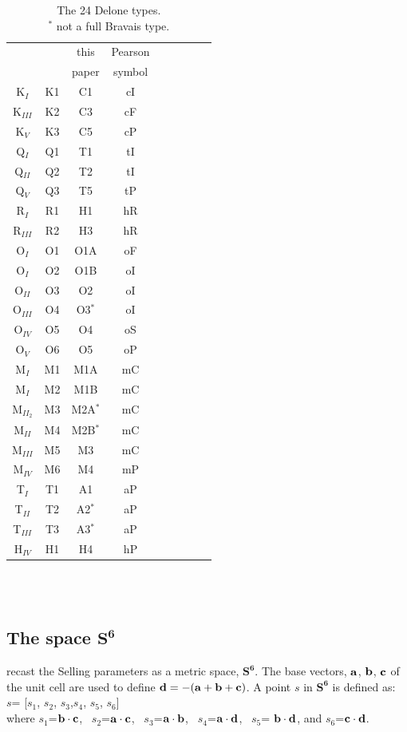 \documentclass[preprint]{iucr}              %
\newcommand{\SVI}[0]{$\mathbf{S^{6}}$}
\newcommand{\scalarsub}[2]{$#1_#2$}
\newcommand{\vdotv}[2]{${{\bf #1 \cdot #2}}$}
\begin{document}
	
	\begin{table}
		\begin{tabular}{ccccccccc}
			\toprule
			\cite{Delaunay1932} & \cite{Burzlaff1985}   &this &Pearson  \\
			&  & paper & symbol\\
			\midrule
			K$_I$ & K1 & C1 & cI \\		
			K$_{III}$ & K2 & C3 &cF \\		
			K$_V$ & K3 & C5 &cP \\		
			Q$_I$ & Q1 & T1 &tI \\		
			Q$_{II}$ & Q2 & T2 &tI \\		
			Q$_V$ & Q3 & T5 & tP\\		
			R$_I$ & R1 & H1 & hR \\		
			R$_{III}$ & R2 & H3 & hR \\		
			O$_I$ & O1 & O1A & oF  \\		
			O$_I$ & O2 & O1B &oI  \\		
			O$_{II}$ & O3 & O2 & oI   \\		
			O$_{III}$ & O4 & O3$^*$ & oI   \\		
			O$_{IV}$ & O5 & O4 & oS   \\		
			O$_V$ & O6 & O5 & oP   \\		
			M$_I$ & M1 & M1A & mC  \\		
			M$_I$ & M2 & M1B & mC \\		
			M$_{II_2}$  & M3 & M2A$^*$ & mC \\		
			M$_{II}$ & M4 & M2B$^*$ & mC  \\		
			M$_{III}$ & M5 & M3 & mC  \\		
			M$_{IV}$ & M6 & M4 & mP  \\		
			T$_I$ & T1 & A1 & aP  \\ 		
			T$_{II}$ & T2 & A2$^*$ & aP \\		
			T$_{III}$ & T3 & A3$^*$ & aP \\		
			H$_{IV}$  & H1 & H4 & hP \\ 
			\bottomrule
		\end{tabular}
		~\\ ~\\
		\caption{The 24 Delone types. \cite{Delaunay1932}\\
			$^*$ not a full Bravais type.}
		\label{table:DeloneTypeConcordance}
	\end{table}
	
	\subsection{The space \SVI{}}
	 recast the Selling parameters as a metric space, \SVI{}.
	The base vectors, $\bf{a}$, $\bf{b}$, $\bf{c}$ of the unit cell
	are used to define $\bf{d}=-(\bf{a}+\bf{b}+\bf{c})$.
	A point ${s}$ in \SVI{} is defined as:\\
	${s}$= [\scalarsub{s}{1}, \scalarsub{s}{2}, \scalarsub{s}{3},\scalarsub{s}{4}, \scalarsub{s}{5}, \scalarsub{s}{6}] \\
	where \scalarsub{s}{1}=\vdotv{b}{c}, ~\scalarsub{s}{2}=\vdotv{a}{c}, ~\scalarsub{s}{3}=\vdotv{a}{b}, 
	~\scalarsub{s}{4}=\vdotv{a}{d}, ~\scalarsub{s}{5}= \vdotv{b}{d}, and \scalarsub{s}{6}=\vdotv{c}{d}.
	
\end{document}
